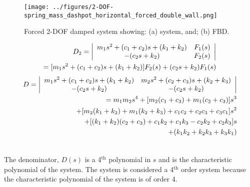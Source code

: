 \documentclass[12pt,letter]{article}
\begin{document}
	\begin{figure}[tp]
		\centering
		\texttt{[image: ../figures/2-DOF-spring\_mass\_dashpot\_horizontal\_forced\_double\_wall.png]}
		\vspace{-2ex}
		\caption{Forced 2-DOF damped system showing: (a) system, and; (b) FBD.}
		\label{fig:2-DOF-spring_mass_dashpot_horizontal_double_wall}
		\vspace{-1ex}
	\end{figure}	
	\begin{eqnarray}
			\vspace{-1ex}
	D_2 = \left|
	\begin{array}{cc}
	m_1 s^2 + (c_1 + c_2)s + (k_1+k_2)  & F_1(s) \\
	-(c_2s+k_2)  & F_2(s) \\
	\end{array}
	\right| \\
	= [m_1 s^2 + (c_1 + c_2)s + (k_1+k_2)]F_2(s) + (c_2s+k_2)F_1(s)  \nonumber
	\end{eqnarray}
	\begin{eqnarray}
				\vspace{-1ex}
	D = \left|
	\begin{array}{cc}
	m_1 s^2 + (c_1 + c_2)s + (k_1+k_2) & m_2 s^2 + (c_2 + c_3)s + (k_2+k_3) \\
	-(c_2s+k_2) & -(c_2s+k_2) \\
	\end{array}
	\right| \\ \nonumber
	= m_1m_2s^4 + [m_2(c_1+c_3)+m_1(c_2+c_3)]s^3 \\  \nonumber
	+ [m_2(k_1+k_2)+m_1(k_2+k_3)+c_1c_2+c_2c_3+c_3c_1]s^2 \\  \nonumber
	+ [(k_1+k_2)(c_2+c_3)+c_1k_2+c_1k_3-c_2k_2+c_2k_3]s \\  \nonumber
	+ (k_1k_2 + k_2k_3 + k_3k_1) \\  \nonumber
			\vspace{-1ex}
	\end{eqnarray}
		
	The denominator, $D(s)$ is a 4$^{\text{th}}$ polynomial in $s$ and is the characteristic polynomial of the system. The system is considered a 4$^{\text{th}}$ order system because the characteristic polynomial of the system is of order 4. 
	
\end{document}
